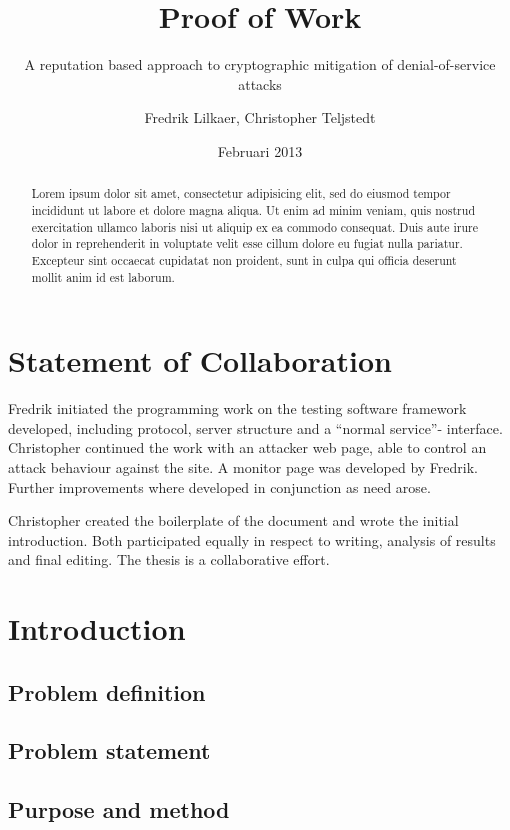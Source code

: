 \documentclass[a4paper,11pt]{kth-mag}
\title{Proof of Work}
\subtitle{A reputation based approach to cryptographic mitigation of denial-of-service attacks}
\author{Fredrik Lilkaer, Christopher Teljstedt}
\date{Februari 2013}
\begin{document}
\removepagenumbers
\maketitle
{}
\newpage
\begin{abstract}
Lorem ipsum dolor sit amet, consectetur adipisicing elit, sed do eiusmod tempor incididunt ut labore et dolore magna aliqua. Ut enim ad minim veniam, quis nostrud exercitation ullamco laboris nisi ut aliquip ex ea commodo consequat. Duis aute irure dolor in reprehenderit in voluptate velit esse cillum dolore eu fugiat nulla pariatur. Excepteur sint occaecat cupidatat non proident, sunt in culpa qui officia deserunt mollit anim id est laborum.
\end{abstract}
\newpage
\section*{Statement of Collaboration}
Fredrik initiated the programming work on the testing software framework developed, including protocol, server structure and a ``normal service''- interface.
Christopher continued the work with an attacker web page, able to control an attack behaviour against the site. A monitor page was developed by Fredrik. Further improvements where developed in conjunction as need arose.

Christopher created the boilerplate of the document and wrote the initial introduction.
Both participated equally in respect to writing, analysis of results and final editing. The thesis is a collaborative effort.
\newpage  
\setcounter{section}{0}
\tableofcontents
\newpage
\section{Introduction}


\subsection{Problem definition}

\subsection{Problem statement} %

\subsection{Purpose and method}

\end{document}
